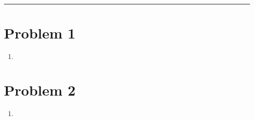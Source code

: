\documentclass[12pt]{article}
\author{Kiran Jones \\
  \texttt{kiran.p.jones.27@dartmouth.edu}}
\begin{document}
  \maketitle



  \noindent
  \rule{\linewidth}{0.4pt}
  
  \section*{Problem 1}

  \begin{enumerate}[label=(\alph*)]
    \item 
  \end{enumerate}

  \section*{Problem 2}

  \begin{enumerate}[label=(\alph*)]
    \item 
  \end{enumerate}
\end{document}
